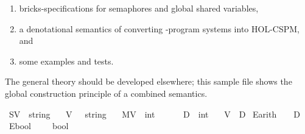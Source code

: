 \begin{isabellebody}
\begin{isamarkuptext}
\begin{enumerate}
\item bricks-specifications for semaphores and global shared variables,

\item a denotational semantics of  converting -program 
systems into HOL-CSPM, and

\item some examples and tests.%
\end{enumerate}

The general theory should be developed elsewhere; this sample file shows the 
global construction principle of a combined semantics.%
\end{isamarkuptext}\isamarkuptrue%
%
\isadelimdocument
%
\endisadelimdocument
%
\isatagdocument
%
\isamarkuptrue%
%
\endisatagdocument
{\isafolddocument}%
%
\isadelimdocument
%
\endisadelimdocument
{}\isamarkupfalse%
\ SV\ {\isacharequal}{\kern0pt}\ string\ \ %
\isanewline
{}\isamarkupfalse%
\ V\ \ {\isacharequal}{\kern0pt}\ string\ \ %
\isanewline
{}\isamarkupfalse%
\ MV\ {\isacharequal}{\kern0pt}\ int\ \ \ \ \ %
\isanewline
\isanewline
{}\isamarkupfalse%
\ D\ {\isacharequal}{\kern0pt}\ int\isanewline
\isanewline
{}\isamarkupfalse%
\ {\isachardoublequoteopen}{\isasymsigma}{\isachardoublequoteclose}\ {\isacharequal}{\kern0pt}\ {\isacartoucheopen}V\ {\isasymRightarrow}\ D{\isacartoucheclose}\isanewline
\isanewline
{}\isamarkupfalse%
\ {\isachardoublequoteopen}E\isactrlsub a\isactrlsub r\isactrlsub i\isactrlsub t\isactrlsub h{\isachardoublequoteclose}\ {\isacharequal}{\kern0pt}\ {\isacartoucheopen}{\isasymsigma}\ {\isasymRightarrow}\ D{\isacartoucheclose}\isanewline
{}\isamarkupfalse%
\ {\isachardoublequoteopen}E\isactrlsub b\isactrlsub o\isactrlsub o\isactrlsub l{\isachardoublequoteclose}\ \ {\isacharequal}{\kern0pt}\ {\isacartoucheopen}{\isasymsigma}\ {\isasymRightarrow}\ bool{\isacartoucheclose}\isanewline

\end{isabellebody}
